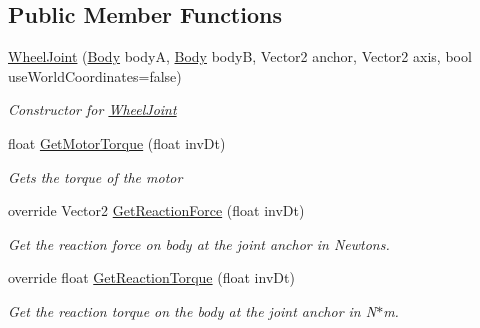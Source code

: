 \subsection*{Public Member Functions}
\begin{DoxyCompactItemize}
\item 
\hyperlink{class_farseer_physics_1_1_dynamics_1_1_joints_1_1_wheel_joint_a28bc5fdbcb2a18696aca4d714402c937}{Wheel\+Joint} (\hyperlink{class_farseer_physics_1_1_dynamics_1_1_body}{Body} body\+A, \hyperlink{class_farseer_physics_1_1_dynamics_1_1_body}{Body} body\+B, Vector2 anchor, Vector2 axis, bool use\+World\+Coordinates=false)
\begin{DoxyCompactList}\small\item\em Constructor for \hyperlink{class_farseer_physics_1_1_dynamics_1_1_joints_1_1_wheel_joint}{Wheel\+Joint} \end{DoxyCompactList}\item 
float \hyperlink{class_farseer_physics_1_1_dynamics_1_1_joints_1_1_wheel_joint_a479bbcf7394644f6a8770a063bf0f0c2}{Get\+Motor\+Torque} (float inv\+Dt)
\begin{DoxyCompactList}\small\item\em Gets the torque of the motor \end{DoxyCompactList}\item 
override Vector2 \hyperlink{class_farseer_physics_1_1_dynamics_1_1_joints_1_1_wheel_joint_abe016ecc52738d2507053c6629ac2026}{Get\+Reaction\+Force} (float inv\+Dt)
\begin{DoxyCompactList}\small\item\em Get the reaction force on body at the joint anchor in Newtons. \end{DoxyCompactList}\item 
override float \hyperlink{class_farseer_physics_1_1_dynamics_1_1_joints_1_1_wheel_joint_ab838e16faa39f71aa7178f52896678a2}{Get\+Reaction\+Torque} (float inv\+Dt)
\begin{DoxyCompactList}\small\item\em Get the reaction torque on the body at the joint anchor in N$\ast$m. \end{DoxyCompactList}\end{DoxyCompactItemize}
